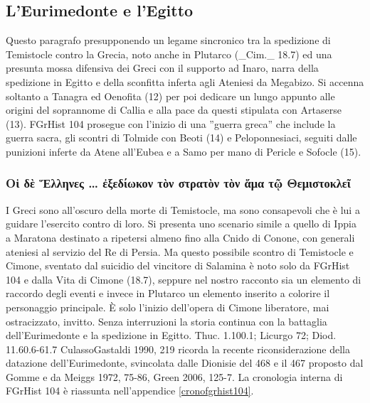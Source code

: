 {            \subsection*{L'Eurimedonte e l'Egitto}
            Questo paragrafo presupponendo un legame sincronico tra la spedizione di Temistocle contro la Grecia, noto anche in Plutarco (_Cim._ 18.7) ed una presunta mossa difensiva dei Greci con il supporto ad Inaro, narra della spedizione in Egitto e della sconfitta inferta agli Ateniesi da Megabizo. Si accenna soltanto a Tanagra ed Oenofita (12) per poi dedicare un lungo appunto alle origini del soprannome di Callia e alla pace da questi stipulata con Artaserse  (13). FGrHist 104 prosegue con l'inizio di una ''guerra greca'' che include la guerra sacra, gli scontri di  Tolmide con Beoti (14) e Peloponnesiaci, seguiti dalle punizioni inferte da Atene all'Eubea e a Samo per mano di Pericle  e Sofocle (15).
            \subsubsection{\textgreek{Οἱ δὲ Ἕλληνες  …  ἐξεδίωκον τὸν στρατὸν τὸν ἅμα τῷ Θεμιστοκλεῖ}}
            I Greci sono all'oscuro della morte di Temistocle, ma sono consapevoli che è lui a guidare l'esercito contro di loro. Si presenta uno scenario simile a quello di Ippia a Maratona destinato a ripetersi almeno fino alla Cnido di Conone, con generali ateniesi al servizio del Re di Persia. Ma questo possibile scontro di Temistocle e Cimone, sventato dal suicidio del vincitore di Salamina è noto solo da FGrHist 104 e dalla Vita di  Cimone (18.7), seppure nel nostro racconto sia un elemento di raccordo degli eventi e invece in Plutarco un elemento inserito a colorire il personaggio principale. È solo l'inizio dell'opera di  Cimone liberatore, mai ostracizzato, invitto. Senza interruzioni la storia continua con la battaglia dell'Eurimedonte e la spedizione in Egitto. Thuc. 1.100.1; Licurgo  72; Diod. 11.60.6-61.7 CulassoGastaldi 1990, 219 ricorda la recente riconsiderazione della datazione dell'Eurimedonte, svincolata dalle Dionisie del 468 e il 467 proposto dal Gomme e da Meiggs 1972, 75-86, Green 2006, 125-7. La cronologia interna di FGrHist 104 è riassunta nell'appendice \ref{cronofgrhist104}.
}

